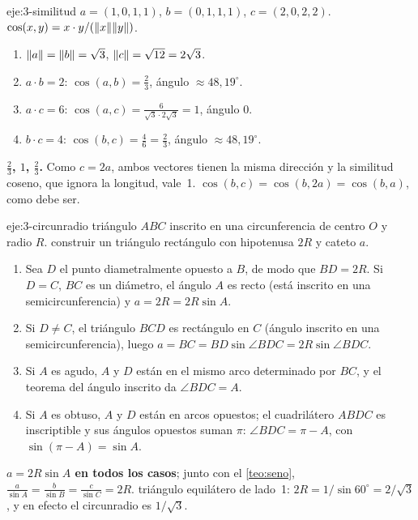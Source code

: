 \begin{solucion}{eje:3-similitud}
\datos $a=(1,0,1,1)$, $b=(0,1,1,1)$, $c=(2,0,2,2)$.
\planteamiento $\cos(x,y)=x\cdot y/(\lVert x\rVert\lVert y\rVert)$.
\pasos
\begin{enumerate}[label=\arabic*.]
  \item $\lVert a\rVert=\lVert b\rVert=\sqrt3$, $\lVert c\rVert=\sqrt{12}=2\sqrt3$.
  \item $a\cdot b=2$: $\cos(a,b)=\frac{2}{3}$, ángulo $\approx48{,}19^{\circ}$.
  \item $a\cdot c=6$: $\cos(a,c)=\frac{6}{\sqrt3\cdot2\sqrt3}=1$, ángulo $0$.
  \item $b\cdot c=4$: $\cos(b,c)=\frac{4}{6}=\frac23$, ángulo $\approx48{,}19^{\circ}$.
\end{enumerate}
\resultado \textbf{$\frac23$, $1$, $\frac23$.} Como $c=2a$, ambos vectores tienen la misma dirección y la similitud coseno, que ignora la longitud, vale~1.
\comprobacion $\cos(b,c)=\cos(b,2a)=\cos(b,a)$, como debe ser.
\end{solucion}

\begin{solucion}{eje:3-circunradio}
\datos triángulo $ABC$ inscrito en una circunferencia de centro $O$ y radio $R$.
\planteamiento construir un triángulo rectángulo con hipotenusa $2R$ y cateto $a$.
\pasos
\begin{enumerate}[label=\arabic*.]
  \item Sea $D$ el punto diametralmente opuesto a $B$, de modo que $BD=2R$. Si $D=C$, $BC$ es un diámetro, el ángulo $A$ es recto (está inscrito en una semicircunferencia) y $a=2R=2R\sin A$.
  \item Si $D\ne C$, el triángulo $BCD$ es rectángulo en $C$ (ángulo inscrito en una semicircunferencia), luego $a=BC=BD\sin\angle BDC=2R\sin\angle BDC$.
  \item Si $A$ es agudo, $A$ y $D$ están en el mismo arco determinado por $BC$, y el teorema del ángulo inscrito da $\angle BDC=A$.
  \item Si $A$ es obtuso, $A$ y $D$ están en arcos opuestos; el cuadrilátero $ABDC$ es inscriptible y sus ángulos opuestos suman $\pi$: $\angle BDC=\pi-A$, con $\sin(\pi-A)=\sin A$.
\end{enumerate}
\resultado \textbf{$a=2R\sin A$ en todos los casos}; junto con el \cref{teo:seno}, $\frac{a}{\sin A}=\frac{b}{\sin B}=\frac{c}{\sin C}=2R$.
\comprobacion triángulo equilátero de lado~1: $2R=1/\sin60^{\circ}=2/\sqrt3$, y en efecto el circunradio es $1/\sqrt3$.
\end{solucion}

